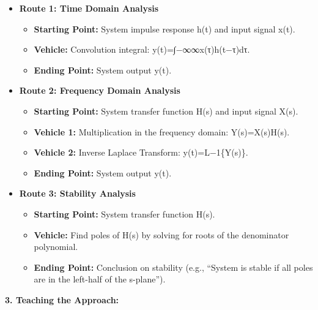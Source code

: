 \documentclass[
  letterpaper,
  DIV=11,
  numbers=noendperiod]{scrreprt}
\begin{document}
\begin{itemize}
\item
  \textbf{Route 1: Time Domain Analysis}

  \begin{itemize}
  \item
    \textbf{Starting Point:} System impulse response h(t) and input
    signal x(t).
  \item
    \textbf{Vehicle:} Convolution integral:
    y(t)=∫−∞∞\hspace{0pt}x(τ)h(t−τ)dτ.
  \item
    \textbf{Ending Point:} System output y(t).
  \end{itemize}
\item
  \textbf{Route 2: Frequency Domain Analysis}

  \begin{itemize}
  \item
    \textbf{Starting Point:} System transfer function H(s) and input
    signal X(s).
  \item
    \textbf{Vehicle 1:} Multiplication in the frequency domain:
    Y(s)=X(s)H(s).
  \item
    \textbf{Vehicle 2:} Inverse Laplace Transform: y(t)=L−1\{Y(s)\}.
  \item
    \textbf{Ending Point:} System output y(t).
  \end{itemize}
\item
  \textbf{Route 3: Stability Analysis}

  \begin{itemize}
  \item
    \textbf{Starting Point:} System transfer function H(s).
  \item
    \textbf{Vehicle:} Find poles of H(s) by solving for roots of the
    denominator polynomial.
  \item
    \textbf{Ending Point:} Conclusion on stability (e.g., ``System is
    stable if all poles are in the left-half of the s-plane'').
  \end{itemize}
\end{itemize}

\textbf{3. Teaching the Approach:}
\end{document}
